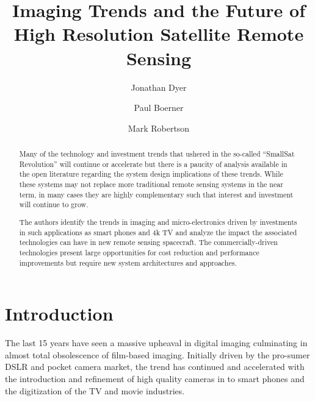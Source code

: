 \documentclass[]{spieman}  %
\title{Imaging Trends and the Future of \\High Resolution Satellite Remote Sensing}
\begin{document}
\newtheorem{mydef}{Definition}
\newtheorem{observation}{Observation}

\makeatletter
\newcommand\footnoteref[1]{\protected@xdef\@thefnmark{\ref{#1}}\@footnotemark}
\makeatother

\author[a]{Jonathan Dyer}
\author[b]{Paul Boerner}
\author[a]{Mark Robertson}
%

\maketitle
        
\begin{abstract}
Many of the technology and investment trends that ushered in the so-called ``SmallSat Revolution'' will continue or accelerate but there is a paucity of analysis available in the open literature regarding the system design implications of these trends.  While these systems may not replace more traditional remote sensing systems in the near term, in many cases they are highly complementary such that interest and investment will continue to grow.

The authors identify the trends in imaging and micro-electronics driven by investments in such applications as smart phones and 4k TV and analyze the impact the associated technologies can have in new remote sensing spacecraft.  The commercially-driven technologies present large opportunities for cost reduction and performance improvements but require new system architectures and approaches.
\end{abstract}




\section{Introduction}
\label{sec:introduction}

The last 15 years have seen a massive upheaval in digital imaging culminating in almost total obsolescence of film-based imaging.  Initially driven by the pro-sumer DSLR and pocket camera market, the trend has continued and accelerated with the introduction and refinement of high quality cameras in to smart phones and the digitization of the TV and movie industries.
\end{document}
